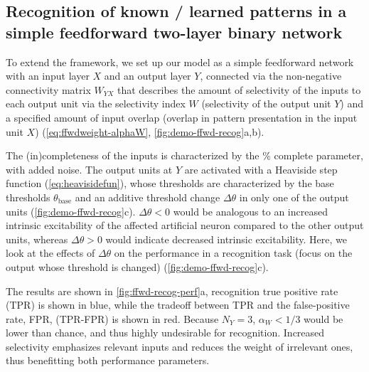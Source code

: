 \subsection{Recognition of known / learned patterns in a simple feedforward two-layer binary network}

To extend the framework, we set up our model as a simple feedforward network
    with an input layer $X$ and an output layer $Y$,
    connected via the non-negative connectivity matrix $W_{YX}$
        that describes the amount of selectivity of the inputs to each output unit via
            the selectivity index $W$ (selectivity of the output unit $Y$)
            and a specified amount of input overlap (overlap in pattern presentation in the input unit $X$)
            (\autoref{eq:ffwdweight-alphaW}, \autoref{fig:demo-ffwd-recog}a,b).



The (in)completeness of the inputs is characterized by
        the \% complete parameter, with added noise.
    The output units at $Y$ are activated with a Heaviside step function (\autoref{eq:heavisidefun}), whose thresholds are characterized by
        the base thresholds $\theta_{\text{base}}$
        and an additive threshold change $\Delta \theta$ in only one of the output units (\autoref{fig:demo-ffwd-recog}c).
    $\Delta \theta < 0$ would be analogous to an increased intrinsic excitability of the affected artificial neuron compared to the other output units,
        whereas $\Delta \theta > 0$ would indicate decreased intrinsic excitability.
    Here, we look at the effects of $\Delta \theta$ on the performance in a recognition task
        (focus on the output whose threshold is changed) (\autoref{fig:demo-ffwd-recog}c).

The results are shown in \autoref{fig:ffwd-recog-perf}a,
        recognition true positive rate (TPR) is shown in blue,
        while the tradeoff between TPR and the false-positive rate, FPR, (TPR-FPR) is shown in red.
    Because $N_Y=3$, $\alpha_W < 1/3$ would be lower than chance,
        and thus highly undesirable for recognition.
    Increased selectivity emphasizes relevant inputs and reduces the weight of irrelevant ones, thus benefitting both performance parameters.



